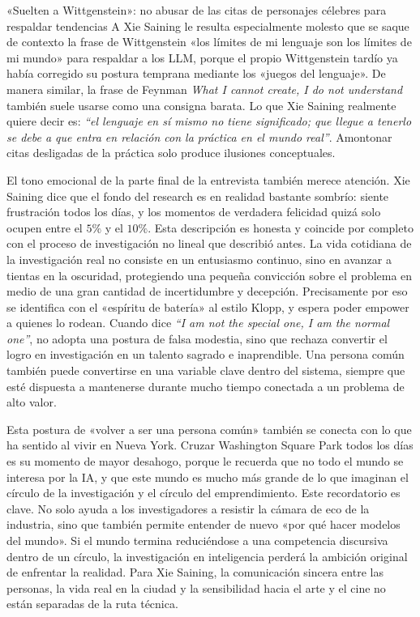 \begin{warningbox}{«Suelten a Wittgenstein»: no abusar de las citas de personajes célebres para respaldar tendencias}
A Xie Saining le resulta especialmente molesto que se saque de contexto la frase de Wittgenstein «los límites de mi lenguaje son los límites de mi mundo» para respaldar a los LLM, porque el propio Wittgenstein tardío ya había corregido su postura temprana mediante los «juegos del lenguaje». De manera similar, la frase de Feynman \textit{What I cannot create, I do not understand} también suele usarse como una consigna barata. Lo que Xie Saining realmente quiere decir es: \textit{``el lenguaje en sí mismo no tiene significado; que llegue a tenerlo se debe a que entra en relación con la práctica en el mundo real''}. Amontonar citas desligadas de la práctica solo produce ilusiones conceptuales.
\end{warningbox}

El tono emocional de la parte final de la entrevista también merece atención. Xie Saining dice que el fondo del research es en realidad bastante sombrío: siente frustración todos los días, y los momentos de verdadera felicidad quizá solo ocupen entre el \(5\%\) y el \(10\%\). Esta descripción es honesta y coincide por completo con el proceso de investigación no lineal que describió antes. La vida cotidiana de la investigación real no consiste en un entusiasmo continuo, sino en avanzar a tientas en la oscuridad, protegiendo una pequeña convicción sobre el problema en medio de una gran cantidad de incertidumbre y decepción. Precisamente por eso se identifica con el «espíritu de batería» al estilo Klopp, y espera poder empower a quienes lo rodean. Cuando dice \textit{``I am not the special one, I am the normal one''}, no adopta una postura de falsa modestia, sino que rechaza convertir el logro en investigación en un talento sagrado e inaprendible. Una persona común también puede convertirse en una variable clave dentro del sistema, siempre que esté dispuesta a mantenerse durante mucho tiempo conectada a un problema de alto valor.

Esta postura de «volver a ser una persona común» también se conecta con lo que ha sentido al vivir en Nueva York. Cruzar Washington Square Park todos los días es su momento de mayor desahogo, porque le recuerda que no todo el mundo se interesa por la IA, y que este mundo es mucho más grande de lo que imaginan el círculo de la investigación y el círculo del emprendimiento. Este recordatorio es clave. No solo ayuda a los investigadores a resistir la cámara de eco de la industria, sino que también permite entender de nuevo «por qué hacer modelos del mundo». Si el mundo termina reduciéndose a una competencia discursiva dentro de un círculo, la investigación en inteligencia perderá la ambición original de enfrentar la realidad. Para Xie Saining, la comunicación sincera entre las personas, la vida real en la ciudad y la sensibilidad hacia el arte y el cine no están separadas de la ruta técnica.

